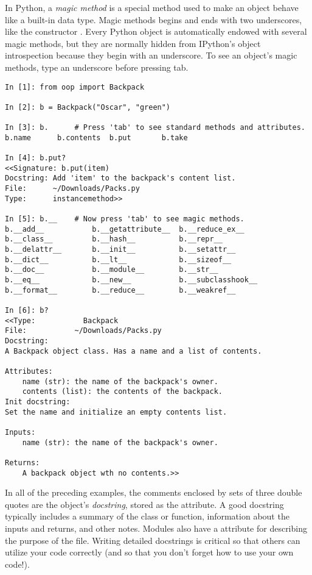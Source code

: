 In Python, a \emph{magic method} is a special method used to make an object behave like a built-in data type.
Magic methods begins and ends with two underscores, like the constructor .
Every Python object is automatically endowed with several magic methods, but they are normally hidden from IPython's object introspection because they begin with an underscore.
To see an object's magic methods, type an underscore before pressing tab.

\begin{lstlisting}
In [1]: from oop import Backpack

In [2]: b = Backpack("Oscar", "green")

In [3]: b.      # Press 'tab' to see standard methods and attributes.
b.name      b.contents  b.put       b.take

In [4]: b.put?
<<Signature: b.put(item)
Docstring: Add 'item' to the backpack's content list.
File:      ~/Downloads/Packs.py
Type:      instancemethod>>

In [5]: b.__	# Now press 'tab' to see magic methods.
b.__add__           b.__getattribute__  b.__reduce_ex__
b.__class__         b.__hash__          b.__repr__
b.__delattr__       b.__init__          b.__setattr__
b.__dict__          b.__lt__            b.__sizeof__
b.__doc__           b.__module__        b.__str__
b.__eq__            b.__new__           b.__subclasshook__
b.__format__        b.__reduce__        b.__weakref__

In [6]: b?
<<Type:           Backpack
File:           ~/Downloads/Packs.py
Docstring:
A Backpack object class. Has a name and a list of contents.

Attributes:
    name (str): the name of the backpack's owner.
    contents (list): the contents of the backpack.
Init docstring:
Set the name and initialize an empty contents list.

Inputs:
    name (str): the name of the backpack's owner.

Returns:
    A backpack object wth no contents.>>
\end{lstlisting}

\begin{info}
In all of the preceding examples, the comments enclosed by sets of three double quotes are the object's \emph{docstring}, stored as the  attribute.
A good docstring typically includes a summary of the class or function, information about the inputs and returns, and other notes.
Modules also have a  attribute for describing the purpose of the file.
Writing detailed docstrings is critical so that others can utilize your code correctly (and so that you don't forget how to use your own code!).
\end{info}

